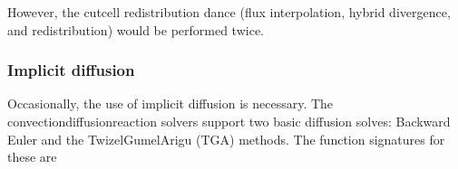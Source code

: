 \documentclass[letterpaper,10pt,english]{sphinxmanual}
\begin{document}
\begin{sphinxVerbatim}[commandchars=\\\{\},formatcom=\scriptsize]
 

    

   
          

       
           
\end{sphinxVerbatim}

\sphinxAtStartPar
However, the cut\sphinxhyphen{}cell redistribution dance (flux interpolation, hybrid divergence, and redistribution) would be performed twice.


\subsubsection{Implicit diffusion}
\label{\detokenize{Solvers/CDR:implicit-diffusion}}\label{\detokenize{Solvers/CDR:chap-implicitdiffusion}}
\sphinxAtStartPar
Occasionally, the use of implicit diffusion is necessary.
The convection\sphinxhyphen{}diffusion\sphinxhyphen{}reaction solvers support two basic diffusion solves:
Backward Euler and the Twizel\sphinxhyphen{}Gumel\sphinxhyphen{}Arigu (TGA) methods.
The function signatures for these are
\end{document}
